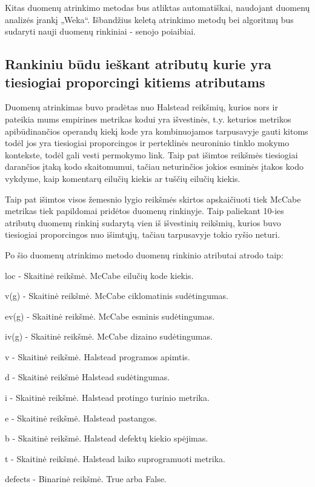 \documentclass{VUMIFPSbakalaurinis}
\begin{document}
Kitas duomenų atrinkimo metodas bus atliktas automatiškai, naudojant duomenų analizės įrankį „Weka“. Išbandžius keletą atrinkimo metodų bei algoritmų bus sudaryti nauji duomenų rinkiniai - senojo poiaibiai.

\subsection{Rankiniu būdu ieškant atributų kurie yra tiesiogiai proporcingi kitiems atributams}

Duomenų atrinkimas buvo pradėtas nuo Halstead reikšmių, kurios nors ir pateikia mums empirines metrikas kodui yra išvestinės, t.y. keturios metrikos apibūdinančios operandų kiekį kode yra kombinuojamos tarpusavyje gauti kitoms todėl jos yra tiesiogiai proporcingos ir perteklinės neuroninio tinklo mokymo kontekste, todėl gali vesti permokymo link. Taip pat išimtos reikšmės tiesiogiai darančios įtaką kodo skaitomumui, tačiau neturinčios jokios esminės įtakos kodo vykdyme, kaip komentarų eilučių kiekis ar tuščių eilučių kiekis.

Taip pat išimtos visos žemesnio lygio reikšmės skirtos apskaičiuoti tiek McCabe metrikas tiek papildomai pridėtos duomenų rinkinyje. Taip paliekant 10-ies atributų duomenų rinkinį sudarytą vien iš išvestinių reikšmių, kurios buvo tiesiogiai proporcingos nuo išimtųjų, tačiau tarpusavyje tokio ryšio neturi.

Po šio duomenų atrinkimo metodo duomenų rinkinio atributai atrodo taip:
\begin{description} 
\item loc - Skaitinė reikšmė. McCabe eilučių kode kiekis.
\item v(g) - Skaitinė reikšmė. McCabe ciklomatinis sudėtingumas.
\item ev(g) - Skaitinė reikšmė. McCabe esminis sudėtingumas.
\item iv(g) - Skaitinė reikšmė. McCabe dizaino sudėtingumas.
\item v - Skaitinė reikšmė. Halstead programos apimtis.
\item d - Skaitinė reikšmė Halstead sudėtingumas.
\item i - Skaitinė reikšmė. Halstead protingo turinio metrika.
\item e - Skaitinė reikšmė. Halstead pastangos.
\item b - Skaitinė reikšmė. Halstead defektų kiekio spėjimas.
\item t - Skaitinė reikšmė. Halstead laiko suprogramuoti metrika.
\item defects - Binarinė reikšmė. True arba False.
\end{description} 
\end{document}

